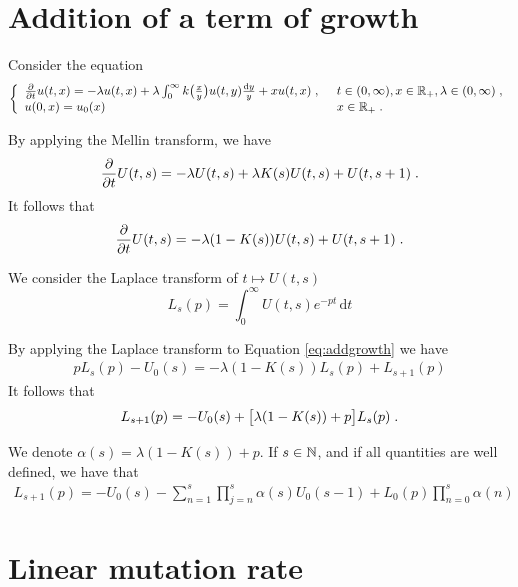 \documentclass[11pt]{amsart}
\newcommand{\diff}{\,\mathrm{d}}
\begin{document}
\section{Addition of a term of growth}

Consider the equation
\begin{equation*}\left\{
    \begin{array}{ll}
	\frac{\partial}{\partial t}u(t,x) = - \lambda u(t,x) + \lambda \int_{0}^{\infty} k\big( \frac{x}{y}\big)u(t,y) \frac{\mathrm dy}{y} + xu(t,x)
	\; , \enspace
	& t \in (0, \infty), x \in \mathbb{R}_+, \lambda \in (0, \infty) \; ,
	\\
	u(0, x) = u_0(x)
	& x \in \mathbb{R}_+
	\; .
    \end{array}
	\right.
\end{equation*}

By applying the Mellin transform, we have
	\begin{equation*}
		\frac{\partial}{\partial t} U(t,s) = - \lambda U(t,s) + \lambda K(s) U(t,s) + U(t,s+1)
		\; .
	\end{equation*}
It follows that
    \begin{equation}
        \frac{\partial}{\partial t} U(t,s) = - \lambda (1-K(s)) U(t,s) + U(t,s+1)
		\; .
        \label{eq:addgrowth}
    \end{equation}

We consider the Laplace transform of $t \mapsto U(t,s)$
$$ L_s(p) = \int_0^\infty U(t,s)e^{-pt}\diff t$$ 

By applying the Laplace transform to Equation \eqref{eq:addgrowth} we have 
\begin{align*}
    pL_s(p) - U_0(s) = -  \lambda (1-K(s)) L_s(p) + L_{s+1}(p)
\end{align*}
It follows that 
\begin{align*}
    L_{s+1}(p) = - U_0(s) + \big[\lambda (1-K(s)) + p \big]L_s(p)
    \; .
\end{align*}

\begin{remark}
We denote $\alpha(s) = \lambda (1-K(s)) + p$. If $s \in \mathbb{N}$, and if all quantities are well defined, we have that
\begin{align*}
    L_{s+1}(p) = -U_0(s) -\sum_{n = 1}^{s} \prod_{j = n}^s \alpha(s)U_0(s-1) + L_0(p) \prod_{n = 0}^{s}\alpha(n)
\end{align*}
\end{remark}



\section{Linear mutation rate}
\end{document}
